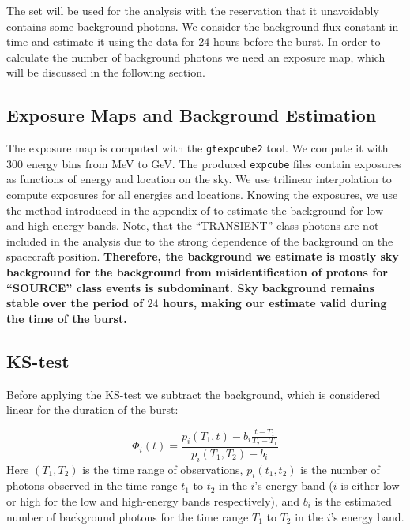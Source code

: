 \documentclass[manuscript]{aastex}
\begin{document}
The set will be used for the analysis with the reservation that it
unavoidably contains some background photons. We consider the
background flux constant in time and estimate it using the data for 24
hours before the burst. In order to calculate the number of background
photons we need an exposure map, which will be discussed in the
following section.

\subsection{Exposure Maps and Background Estimation}

The exposure map is computed with the \texttt{gtexpcube2} tool. We
compute it with 300 energy bins from \unit[100]{MeV} to
\unit[300]{GeV}. The produced \texttt{expcube} files contain exposures
as functions of energy and location on the sky. We use trilinear
interpolation to compute exposures for all energies and
locations. Knowing the exposures, we use the method introduced in the
appendix of \citet{Rubtsov:2011qq} to estimate the background for low
and high-energy bands. Note, that the ``TRANSIENT'' class photons are
not included in the analysis due to the strong dependence of the
background on the spacecraft position.
{\bf Therefore, the background we estimate is mostly sky background
  for the background from misidentification of protons for ``SOURCE''
  class events is subdominant. Sky background remains stable over the period of $24$ hours, making our estimate valid during the time of the burst.}

\subsection{KS-test}

Before applying the KS-test we subtract the background, which is
considered linear for the duration of the burst:

\begin{equation}
	\Phi_i\left(t\right) = \frac{p_i\left(T_1, t\right) - b_i \frac{t-T_1}{T_2-T_1}}{p_i\left(T_1, T_2\right) - b_i}
\end{equation}
Here $\left(T_1, T_2\right)$ is the time range of observations,
$p_i\left(t_1, t_2\right)$ is the number of photons observed in the
time range $t_1$ to $t_2$ in the $i$'s energy band ($i$ is either low
or high for the low and high-energy bands respectively), and $b_i$ is
the estimated number of background photons for the time range $T_1$ to
$T_2$ in the $i$'s energy band.
\end{document}
